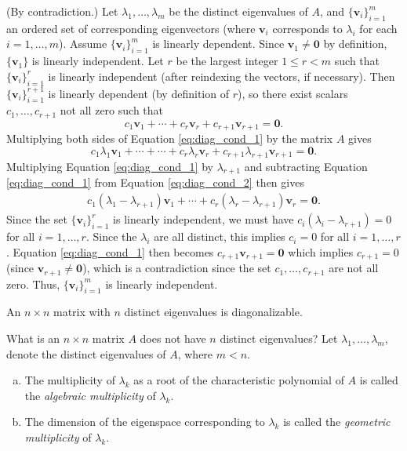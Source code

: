 \documentclass[12pt,letterpaper,reqno]{article}
\numberwithin{equation}{section}
\newcommand{\bv}{\mathbf{v}}
\begin{document}
\begin{pf}
(By contradiction.) Let $\lambda_1,\dots,\lambda_m$ be the distinct eigenvalues of $A$, and $\{\bv_i\}_{i=1}^m$ an ordered set of corresponding eigenvectors (where $\bv_i$ corresponds to $\lambda_i$ for each $i=1,\dots,m$). Assume $\{\bv_i\}_{i=1}^m$ is linearly dependent. Since $\bv_1 \neq \mathbf{0}$ by definition, $\{\bv_1\}$ is linearly independent. Let $r$ be the largest integer $1 \leq r <m$ such that $\{\bv_i\}_{i=1}^r$ is linearly independent (after reindexing the vectors, if necessary). Then $\{\bv_i\}_{i=1}^{r+1}$ is linearly dependent (by definition of $r$), so there exist scalars $c_1,\dots,c_{r+1}$ not all zero such that 
\begin{equation}\label{eq:diag_cond_1}
	c_1\bv_1+\cdots+c_{r}\bv_{r}+c_{r+1}\bv_{r+1}=\mathbf{0}.
\end{equation}	
Multiplying both sides of Equation \eqref{eq:diag_cond_1} by the matrix $A$ gives
\begin{equation}\label{eq:diag_cond_2}
	c_1\lambda_1\bv_1+\cdots+\cdots+ c_{r}\lambda_r \bv_{r}+c_{r+1}\lambda_{r+1}\bv_{r+1}=\mathbf{0}.
\end{equation}
Multiplying Equation \eqref{eq:diag_cond_1} by $\lambda_{r+1}$ and subtracting Equation \eqref{eq:diag_cond_1} from Equation \eqref{eq:diag_cond_2}
 then gives
 \begin{align*}
 	c_1(\lambda_1-\lambda_{r+1})\bv_1+\cdots+c_r(\lambda_r-\lambda_{r+1})\bv_r=\mathbf{0}.
 \end{align*}
 Since the set $\{\bv_i\}_{i=1}^r$ is linearly independent, we must have $c_i(\lambda_i-\lambda_{r+1})=0$ for all $i=1,\dots,r$. Since the $\lambda_i$ are all distinct, this implies $c_i=0$ for all $i=1,\dots,r$. Equation \eqref{eq:diag_cond_1} then becomes $c_{r+1}\bv_{r+1}=\mathbf{0}$ which implies $c_{r+1}=0$ (since $\bv_{r+1} \neq \mathbf{0}$), which is a contradiction since the set $c_1,\dots,c_{r+1}$ are not all zero. Thus, $\{\bv_i\}_{i=1}^m$ is linearly independent.
\end{pf}


\begin{cor}
	An $n \times n$ matrix with $n$ distinct eigenvalues is diagonalizable.
\end{cor}
What is an $n \times n$ matrix $A$ does not have $n$ distinct eigenvalues? Let $\lambda_1,\dots,\lambda_m$, denote the distinct eigenvalues of $A$, where $m < n$.

\begin{defn}
\begin{enumerate}[(a)]
	\item The multiplicity of $\lambda_k$ as a root of the characteristic polynomial of $A$ is called the \emph{algebraic multiplicity} of $\lambda_k$.
	\item The dimension of the eigenspace corresponding to $\lambda_k$ is called the \emph{geometric multiplicity} of $\lambda_k$.
\end{enumerate}	
\end{defn}
\end{document}

